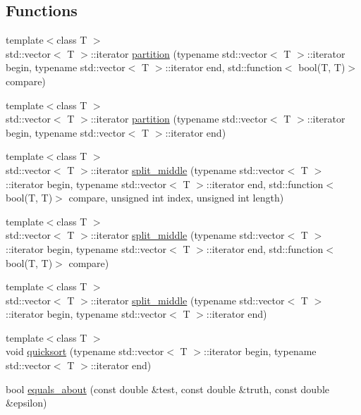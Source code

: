 \subsection*{Functions}
\begin{DoxyCompactItemize}
\item 
{\footnotesize template$<$class T $>$ }\\std\+::vector$<$ T $>$\+::iterator \mbox{\hyperlink{namespaceutility_a6d97e65e822c1bbf339ed3b4125e8604}{partition}} (typename std\+::vector$<$ T $>$\+::iterator begin, typename std\+::vector$<$ T $>$\+::iterator end, std\+::function$<$ bool(T, T)$>$ compare)
\item 
{\footnotesize template$<$class T $>$ }\\std\+::vector$<$ T $>$\+::iterator \mbox{\hyperlink{namespaceutility_a43c3ec927ceecb5da5728af4842503e1}{partition}} (typename std\+::vector$<$ T $>$\+::iterator begin, typename std\+::vector$<$ T $>$\+::iterator end)
\item 
{\footnotesize template$<$class T $>$ }\\std\+::vector$<$ T $>$\+::iterator \mbox{\hyperlink{namespaceutility_a03907272fd935d20384924248438deeb}{split\+\_\+middle}} (typename std\+::vector$<$ T $>$\+::iterator begin, typename std\+::vector$<$ T $>$\+::iterator end, std\+::function$<$ bool(T, T)$>$ compare, unsigned int index, unsigned int length)
\item 
{\footnotesize template$<$class T $>$ }\\std\+::vector$<$ T $>$\+::iterator \mbox{\hyperlink{namespaceutility_af935837d31e0dbf78ed531fa5a9aec39}{split\+\_\+middle}} (typename std\+::vector$<$ T $>$\+::iterator begin, typename std\+::vector$<$ T $>$\+::iterator end, std\+::function$<$ bool(T, T)$>$ compare)
\item 
{\footnotesize template$<$class T $>$ }\\std\+::vector$<$ T $>$\+::iterator \mbox{\hyperlink{namespaceutility_a9defac790e3b7765f83f5a4b73634c5a}{split\+\_\+middle}} (typename std\+::vector$<$ T $>$\+::iterator begin, typename std\+::vector$<$ T $>$\+::iterator end)
\item 
{\footnotesize template$<$class T $>$ }\\void \mbox{\hyperlink{namespaceutility_a44d24bc0a4d5a6b1d919f6035ae2a5dd}{quicksort}} (typename std\+::vector$<$ T $>$\+::iterator begin, typename std\+::vector$<$ T $>$\+::iterator end)
\item 
bool \mbox{\hyperlink{namespaceutility_a48a4f01e19bee62fd4f16da19255abeb}{equals\+\_\+about}} (const double \&test, const double \&truth, const double \&epsilon)

\end{DoxyCompactItemize}
